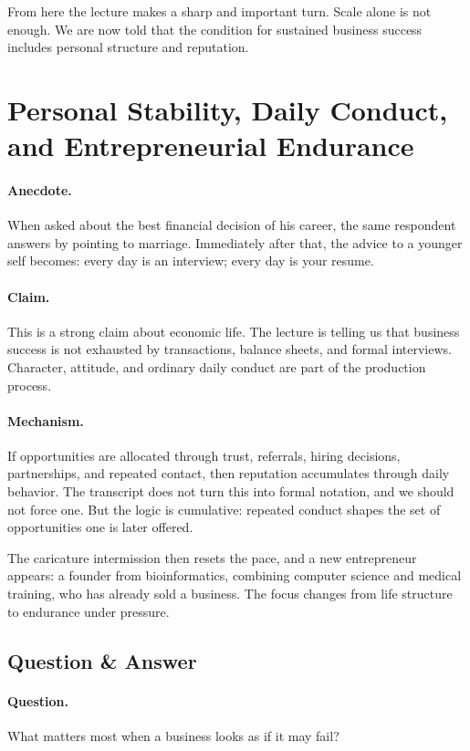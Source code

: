 From here the lecture makes a sharp and important turn. Scale alone is not enough. We are now told that the condition for sustained business success includes personal structure and reputation.

\section{Personal Stability, Daily Conduct, and Entrepreneurial Endurance}

\paragraph{Anecdote.}
When asked about the best financial decision of his career, the same respondent answers by pointing to marriage. Immediately after that, the advice to a younger self becomes: every day is an interview; every day is your resume.

\paragraph{Claim.}
This is a strong claim about economic life. The lecture is telling us that business success is not exhausted by transactions, balance sheets, and formal interviews. Character, attitude, and ordinary daily conduct are part of the production process.

\paragraph{Mechanism.}
If opportunities are allocated through trust, referrals, hiring decisions, partnerships, and repeated contact, then reputation accumulates through daily behavior. The transcript does not turn this into formal notation, and we should not force one. But the logic is cumulative: repeated conduct shapes the set of opportunities one is later offered.

The caricature intermission then resets the pace, and a new entrepreneur appears: a founder from bioinformatics, combining computer science and medical training, who has already sold a business. The focus changes from life structure to endurance under pressure.

\subsection{Question \& Answer}

\paragraph{Question.}
What matters most when a business looks as if it may fail?

